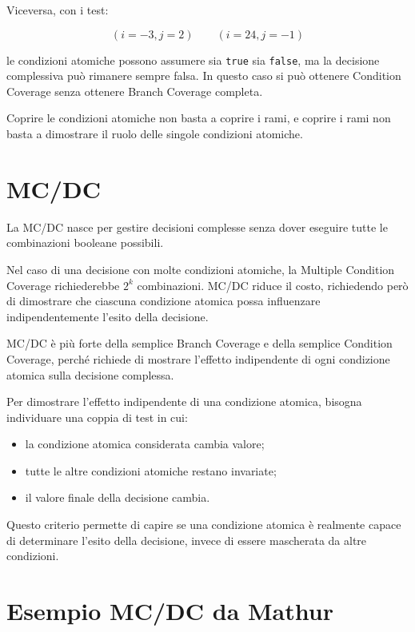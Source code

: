 Viceversa, con i test:

\[
(i=-3, j=2)
\qquad
(i=24, j=-1)
\]

le condizioni atomiche possono assumere sia \texttt{true} sia \texttt{false}, ma la decisione complessiva può rimanere sempre falsa. In questo caso si può ottenere Condition Coverage senza ottenere Branch Coverage completa.

\begin{notaesame}
Coprire le condizioni atomiche non basta a coprire i rami, e coprire i rami non basta a dimostrare il ruolo delle singole condizioni atomiche.
\end{notaesame}

\section{MC/DC}

La MC/DC nasce per gestire decisioni complesse senza dover eseguire tutte le combinazioni booleane possibili.

Nel caso di una decisione con molte condizioni atomiche, la Multiple Condition Coverage richiederebbe \(2^k\) combinazioni. MC/DC riduce il costo, richiedendo però di dimostrare che ciascuna condizione atomica possa influenzare indipendentemente l'esito della decisione.

\begin{notaesame}
MC/DC è più forte della semplice Branch Coverage e della semplice Condition Coverage, perché richiede di mostrare l'effetto indipendente di ogni condizione atomica sulla decisione complessa.
\end{notaesame}

Per dimostrare l'effetto indipendente di una condizione atomica, bisogna individuare una coppia di test in cui:

\begin{itemize}
    \item la condizione atomica considerata cambia valore;
    \item tutte le altre condizioni atomiche restano invariate;
    \item il valore finale della decisione cambia.
\end{itemize}

Questo criterio permette di capire se una condizione atomica è realmente capace di determinare l'esito della decisione, invece di essere mascherata da altre condizioni.

\section{Esempio MC/DC da Mathur}

